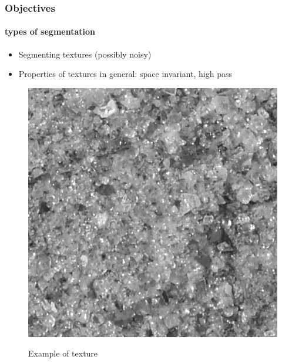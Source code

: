 \documentclass[12pt]{beamer}
\begin{document}
\begin{frame}
  \frametitle{Objectives}
  \framesubtitle{types of segmentation}
  \begin{block}{}
  \begin{itemize}
    \item Segmenting textures (possibly noisy)
    \item Properties of textures in general: space invariant, high pass
  \end{itemize}
  \end{block}
  
  \begin{figure}[H]
  \centering
  \includegraphics[scale=0.2]{../data/glass/glass1_t0}
  \label{fig:glass_texture}
  \caption{Example of texture }
  \end{figure}
\end{frame}
\end{document}

